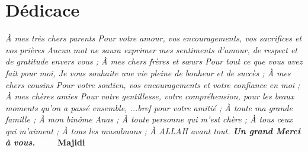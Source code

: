 \chapter*{Dédicace}
\begin{large}
\begin{center}
\centering

\noindent\textit{
À mes très chers parents 
\newline
Pour votre amour, vos encouragements, vos sacrifices et vos prières 
\newline
Aucun mot ne saura exprimer mes sentiments d’amour, de respect et de gratitude envers vous ; 
\newline
À mes chers frères et sœurs 
\newline
Pour tout ce que vous avez fait pour moi, Je vous souhaite une vie pleine de 
\newline
bonheur et de succès ; 
\newline
À mes chers cousins 
\newline
Pour votre soutien, vos encouragements et votre confiance en moi ; 
\newline
À mes chères amies 
\newline
Pour votre gentillesse, votre compréhension, pour les beaux moments qu’on a passé ensemble, ...bref pour votre amitié ; 
\newline
À toute ma grande famille ; 
\newline
À mon binôme Anas ; 
\newline
À toute personne qui m’est chère ; 
\newline
À tous ceux qui m’aiment ; 
\newline
À tous les musulmans ; 
\newline
À ALLAH avant tout. 
\newline
\newline
\textbf{Un grand Merci à vous.}
\newline
}
\newline
\raggedleft\textbf{\textcolor{white}{text}}
\hfill \textbf{Majidi}
\end{center}
\end{large}
\clearpage